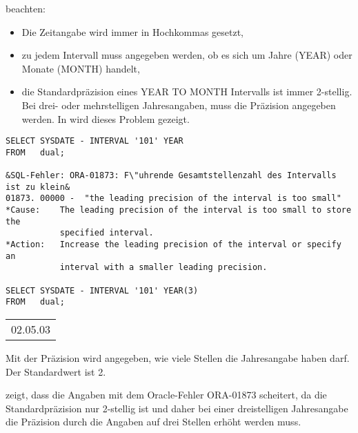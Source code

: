            beachten:
          \begin{itemize}
            \item Die Zeitangabe wird immer in Hochkommas gesetzt,
            \item zu jedem Intervall muss angegeben werden, ob es sich um Jahre (YEAR) oder Monate (MONTH) handelt,
            \item die Standardpr\"azision eines YEAR TO MONTH Intervalls ist immer 2-stellig. Bei drei- oder mehrstelligen Jahresangaben, muss die Pr\"azision angegeben werden. In  wird dieses Problem gezeigt.
          \end{itemize}
          \begin{lstlisting}[language=oracle_sql,caption={Richtiger Umgang mit YEAR TO MONTH Intervallen},label=sql03_20]
SELECT SYSDATE - INTERVAL '101' YEAR
FROM   dual;

&SQL-Fehler: ORA-01873: F\"uhrende Gesamtstellenzahl des Intervalls ist zu klein&
01873. 00000 -  "the leading precision of the interval is too small"
*Cause:    The leading precision of the interval is too small to store the
           specified interval.
*Action:   Increase the leading precision of the interval or specify an
           interval with a smaller leading precision.

SELECT SYSDATE - INTERVAL '101' YEAR(3)
FROM   dual;
          \end{lstlisting}
\clearpage
          \begin{center}
            \begin{small}
              \tablehead{}
              \begin{oraclesql}
                \begin{supertabular}{l}
                  02.05.03 \\
                \end{supertabular}
              \end{oraclesql}
            \end{small}
          \end{center}
          \begin{merke}
            Mit der Pr\"azision wird angegeben, wie viele Stellen die
            Jahresangabe haben darf. Der Standardwert ist 2.
          \end{merke}
           zeigt, dass die Angaben  mit dem Oracle-Fehler ORA-01873 scheitert, da die
          Standardpr\"azision nur 2-stellig ist und daher bei einer
          dreistelligen Jahresangabe die Pr\"azision durch die Angaben
           auf drei Stellen erh\"oht werden muss.

